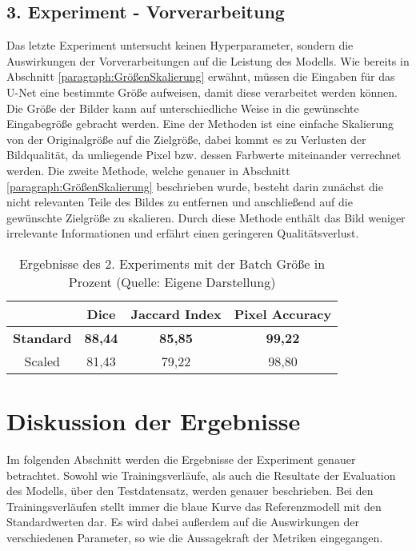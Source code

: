\subsection{3. Experiment - Vorverarbeitung}
Das letzte Experiment untersucht keinen Hyperparameter, sondern die Auswirkungen der Vorverarbeitungen auf die Leistung des \gls{Modell}s. Wie bereits in Abschnitt \ref{paragraph:GrößenSkalierung} erwähnt, müssen die Eingaben für das U-Net eine bestimmte Größe aufweisen, damit diese verarbeitet werden können. Die Größe der Bilder kann auf unterschiedliche Weise in die gewünschte Eingabegröße gebracht werden. Eine der Methoden ist eine einfache Skalierung von der Originalgröße auf die Zielgröße, dabei kommt es zu Verlusten der Bildqualität, da umliegende Pixel bzw. dessen Farbwerte miteinander verrechnet werden. Die zweite Methode, welche genauer in Abschnitt \ref{paragraph:GrößenSkalierung} beschrieben wurde, besteht darin zunächst die nicht relevanten Teile des Bildes zu entfernen und anschließend auf die gewünschte Zielgröße zu skalieren. Durch diese Methode enthält das Bild weniger irrelevante Informationen und erfährt einen geringeren Qualitätsverlust. 
\begin{table}[!h]
	\centering
	\begin{tabular}{|c|c|c|c|}
		\hline
		& Dice & Jaccard Index & Pixel Accuracy \\
		\hline
		\textbf{Standard}& \textbf{88,44} 	& \textbf{85,85}  	& \textbf{99,22}  \\
		\hline
		Scaled		& 81,43  	& 79,22 	& 98,80 \\
		\hline
	\end{tabular}
	\caption{Ergebnisse des 2. Experiments mit der Batch Größe in Prozent (Quelle: Eigene Darstellung)}
\end{table}

\section{Diskussion der Ergebnisse}
Im folgenden Abschnitt werden die Ergebnisse der Experiment genauer betrachtet. Sowohl wie Trainingsverläufe, als auch die Resultate der Evaluation des \gls{Modell}s, über den Testdatensatz, werden genauer beschrieben. Bei den Trainingsverläufen stellt immer die blaue Kurve das Referenzmodell mit den Standardwerten dar. Es wird dabei außerdem auf die Auswirkungen der verschiedenen Parameter, so wie die Aussagekraft der Metriken eingegangen. 

